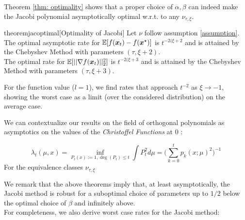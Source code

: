 \documentclass{article}
\begin{document}
Theorem \ref{thm: optimality} shows that a proper choice of $\alpha,\beta$ can indeed make the Jacobi polynomial asymptotically optimal w.r.t. to any $\nu_{\tau,\xi}$. 

\begin{restatable}{theorem}{jacoptimal}[Optimality of Jacobi]\label{thm: optimality}
Let $\nu$ follow assumption \ref{assumption}. \\
The optimal asymptotic rate for $\mathbb{E}[f({\boldsymbol x}_t)-f({\boldsymbol x}^\star)]$ is $t^{-2(\xi+2}$ and is attained by the Chebyshev Method with parameters $(\tau,\xi+2)$. \\
The optimal rate for $\mathbb{E}[||\nabla f({\boldsymbol x}_t)||^2_2]$ is $t^{-2(\xi+3}$ and is attained by the Chebyshev Method with parameters $(\tau,\xi+3)$.
\end{restatable}

For the function value ($l=1$), we find rates that approach $t^{-2}$ as $\xi\rightarrow -1$, showing the worst case as a limit (over the considered distribution) on the average case.
\begin{remark}
We can contextualize our results on the field of orthogonal polynomials as asymptotics on the values of the \textit{Christoffel Functions} at $0$ \cite{totik2005orthogonal}:

\begin{equation}
    \lambda_t(\mu,x)=\inf_{P_t(x):=1,\deg(P_t)\leq t}\int P_t^2 d\mu=\Big( \sum_{k=0}^tp_k(x;\mu)^2\Big)^{-1}
\end{equation}
 For the equivalence classes $\nu_{\tau,\xi}$
\end{remark}
We remark that the above theorems imply that, at least asymptotically, the Jacobi method is robust for a suboptimal choice of parameters up to $1/2$ below the optimal choice of $\beta$ and infinitely above. \\
For completeness, we also derive worst case rates for the Jacobi method:
\end{document}

